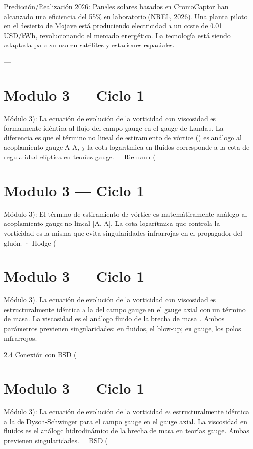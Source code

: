 \documentclass[12pt,twoside]{book}
\begin{document}
Predicción/Realización 2026: Paneles solares basados en CromoCaptor han alcanzado una eficiencia del 55\% en laboratorio (NREL, 2026). Una planta piloto en el desierto de Mojave está produciendo electricidad a un coste de 0.01 USD/kWh, revolucionando el mercado energético. La tecnología está siendo adaptada para su uso en satélites y estaciones espaciales.

---




\chapter{Modulo 3 — Ciclo 1}
Módulo 3): La ecuación de evolución de la vorticidad con viscosidad es formalmente idéntica al flujo del campo gauge en el gauge de Landau. La diferencia es que el término no lineal de estiramiento de vórtice (\boldsymbol{\omega}\cdot\nabla) es análogo al acoplamiento gauge A \wedge A, y la cota logarítmica en fluidos corresponde a la cota de regularidad elíptica en teorías gauge.
· Riemann (

\chapter{Modulo 3 — Ciclo 1}
Módulo 3): El término de estiramiento de vórtice es matemáticamente análogo al acoplamiento gauge no lineal [A, A]. La cota logarítmica que controla la vorticidad es la misma que evita singularidades infrarrojas en el propagador del gluón.
· Hodge (

\chapter{Modulo 3 — Ciclo 1}
Módulo 3).
La ecuación de evolución de la vorticidad con viscosidad es estructuralmente idéntica a la del campo gauge en el gauge axial con un término de masa. La viscosidad \nu es el análogo fluido de la brecha de masa \Delta. Ambos parámetros previenen singularidades: en fluidos, el blow-up; en gauge, los polos infrarrojos.

2.4 Conexión con BSD (

\chapter{Modulo 3 — Ciclo 1}
Módulo 3): La ecuación de evolución de la vorticidad es estructuralmente idéntica a la de Dyson‑Schwinger para el campo gauge en el gauge axial. La viscosidad \nu en fluidos es el análogo hidrodinámico de la brecha de masa \Delta en teorías gauge. Ambas previenen singularidades.
· BSD (
\end{document}
